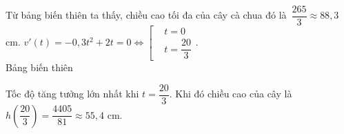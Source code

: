 \begin{ex}
{\begin{itemchoice}
\begin{center}
	\end{center}
	Từ bảng biến thiên ta  thấy, chiều cao tối đa của cây cà chua đó là~$\dfrac{265}{3} \approx 88{,}3$ cm.
	\itemch 
	$v'(t)=-0{,}3t^2+2t=0 \Leftrightarrow\left[\begin{aligned}&t=0 \\&t=\dfrac{20}{3}
	\end{aligned}\right.$.\\
	Bảng biến  thiên
	\begin{center}
	\end{center}
	Tốc độ tăng tưởng lớn  nhất khi $t=\dfrac{20}{3}$. Khi đó chiều cao của cây là~$h\left(\dfrac{20}{3}\right)=\dfrac{4405}{81} \approx 55{,}4$ cm.
	\end{itemchoice}
} 
\end{ex}

